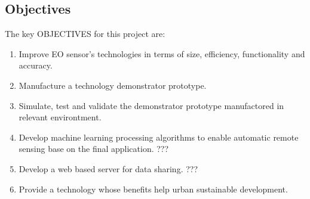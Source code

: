\subsection{Objectives}

The key OBJECTIVES for this project are:

\begin{enumerate}

	\item Improve EO sensor's technologies in terms of size, efficiency, functionality and accuracy.

	\item Manufacture a technology demonstrator prototype.

	\item Simulate, test and validate the demonstrator prototype manufactored in relevant environtment.

	\item Develop machine learning processing algorithms to enable automatic remote sensing base on the final application. ???

	\item Develop a web based server for data sharing. ???

	\item Provide a technology whose benefits help urban sustainable development.

\end{enumerate}
